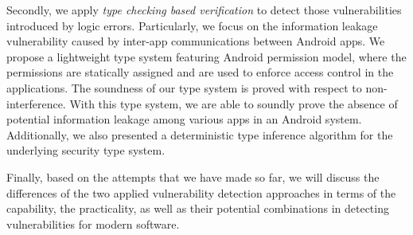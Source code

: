 Secondly, we apply \emph{type checking based verification} to detect those vulnerabilities introduced by logic errors. Particularly, we focus on the information leakage vulnerability caused by inter-app communications between Android apps. 
We propose a lightweight type system featuring Android permission model, where the permissions are statically assigned and are used to enforce access control in the applications. 
The soundness of our type system is proved with respect to non-interference. With this type system, we are able to soundly prove the absence of potential information leakage among various apps in an Android system.
 Additionally, we also presented a deterministic type inference algorithm for the underlying security type system. 

Finally, based on the attempts that we have made so far, we will discuss the differences of the two applied vulnerability detection approaches in terms of the capability, the practicality, as well as their potential combinations in detecting vulnerabilities for modern software.






